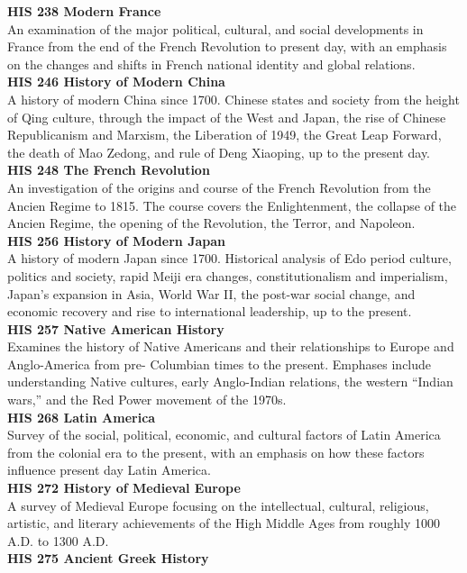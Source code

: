 \documentclass[
  letterpaper,
]{scrbook}
\begin{document}
\textbf{HIS 238 Modern France}\\
An examination of the major political, cultural, and social developments
in France from the end of the French Revolution to present day, with an
emphasis on the changes and shifts in French national identity and
global relations.\\
\textbf{HIS 246 History of Modern China}\\
A history of modern China since 1700. Chinese states and society from
the height of Qing culture, through the impact of the West and Japan,
the rise of Chinese Republicanism and Marxism, the Liberation of 1949,
the Great Leap Forward, the death of Mao Zedong, and rule of Deng
Xiaoping, up to the present day.\\
\textbf{HIS 248 The French Revolution}\\
An investigation of the origins and course of the French Revolution from
the Ancien Regime to 1815. The course covers the Enlightenment, the
collapse of the Ancien Regime, the opening of the Revolution, the
Terror, and Napoleon.\\
\textbf{HIS 256 History of Modern Japan}\\
A history of modern Japan since 1700. Historical analysis of Edo period
culture, politics and society, rapid Meiji era changes,
constitutionalism and imperialism, Japan's expansion in Asia, World War
II, the post-war social change, and economic recovery and rise to
international leadership, up to the present.\\
\textbf{HIS 257 Native American History}\\
Examines the history of Native Americans and their relationships to
Europe and Anglo-America from pre- Columbian times to the present.
Emphases include understanding Native cultures, early Anglo-Indian
relations, the western ``Indian wars,'' and the Red Power movement of
the 1970s.\\
\textbf{HIS 268 Latin America}\\
Survey of the social, political, economic, and cultural factors of Latin
America from the colonial era to the present, with an emphasis on how
these factors influence present day Latin America.\\
\textbf{HIS 272 History of Medieval Europe}\\
A survey of Medieval Europe focusing on the intellectual, cultural,
religious, artistic, and literary achievements of the High Middle Ages
from roughly 1000 A.D. to 1300 A.D.\\
\textbf{HIS 275 Ancient Greek History}\\
\end{document}
